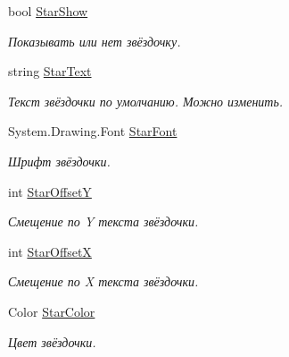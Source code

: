 \begin{DoxyCompactItemize}
bool \mbox{\hyperlink{class_f_b_a_1_1_tab_control_f_b_a_a5218bb930b19625c97a8dee7cb52a4f3}{Star\+Show}}
\begin{DoxyCompactList}\small\item\em Показывать или нет звёздочку. \end{DoxyCompactList}\item 
string \mbox{\hyperlink{class_f_b_a_1_1_tab_control_f_b_a_ae9ede1ab764c0923337bf63647e07fcb}{Star\+Text}}
\begin{DoxyCompactList}\small\item\em Текст звёздочки по умолчанию. Можно изменить. \end{DoxyCompactList}\item 
System.\+Drawing.\+Font \mbox{\hyperlink{class_f_b_a_1_1_tab_control_f_b_a_ae976698842802922a3ef2aca4e1f027d}{Star\+Font}}
\begin{DoxyCompactList}\small\item\em Шрифт звёздочки. \end{DoxyCompactList}\item 
int \mbox{\hyperlink{class_f_b_a_1_1_tab_control_f_b_a_a97c11ae458225455681fb7ae4294e872}{Star\+OffsetY}}
\begin{DoxyCompactList}\small\item\em Смещение по Y текста звёздочки. \end{DoxyCompactList}\item 
int \mbox{\hyperlink{class_f_b_a_1_1_tab_control_f_b_a_ac9129d8ad5e5d8d763971747f821e900}{Star\+OffsetX}}
\begin{DoxyCompactList}\small\item\em Смещение по X текста звёздочки. \end{DoxyCompactList}\item 
Color \mbox{\hyperlink{class_f_b_a_1_1_tab_control_f_b_a_ac57c7c4c7e8864517e2953b08251b827}{Star\+Color}}
\begin{DoxyCompactList}\small\item\em Цвет звёздочки. \end{DoxyCompactList}\item 

\end{DoxyCompactItemize}
